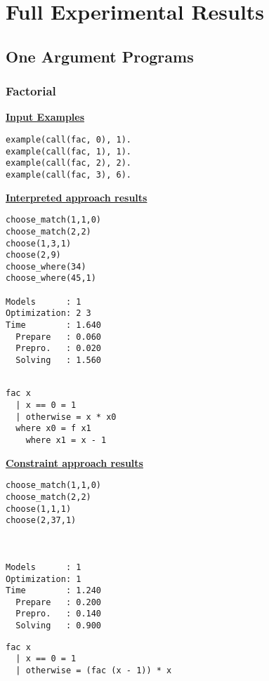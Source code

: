 \chapter{Full Experimental Results}

\section{One Argument Programs}

\subsection{Factorial}
\underline{\textbf{Input Examples}}
\begin{lstlisting}
example(call(fac, 0), 1).
example(call(fac, 1), 1).
example(call(fac, 2), 2).
example(call(fac, 3), 6).
\end{lstlisting}

\begin{multicols*}{2}

\underline{\textbf{Interpreted approach results}}
\begin{lstlisting}
choose_match(1,1,0) 
choose_match(2,2) 
choose(1,3,1) 
choose(2,9) 
choose_where(34) 
choose_where(45,1) 

Models      : 1     
Optimization: 2 3 
Time        : 1.640
  Prepare   : 0.060
  Prepro.   : 0.020
  Solving   : 1.560


\end{lstlisting}

\begin{lstlisting}
fac x
  | x == 0 = 1
  | otherwise = x * x0
  where x0 = f x1
  	where x1 = x - 1
\end{lstlisting}
\vspace*{\fill}
\columnbreak
\underline{\textbf{Constraint approach results}}

\begin{lstlisting}
choose_match(1,1,0)
choose_match(2,2) 
choose(1,1,1) 
choose(2,37,1) 



Models      : 1     
Optimization: 1 
Time        : 1.240
  Prepare   : 0.200
  Prepro.   : 0.140
  Solving   : 0.900
\end{lstlisting}

\begin{lstlisting}
fac x
  | x == 0 = 1
  | otherwise = (fac (x - 1)) * x
\end{lstlisting}
\end{multicols*}

